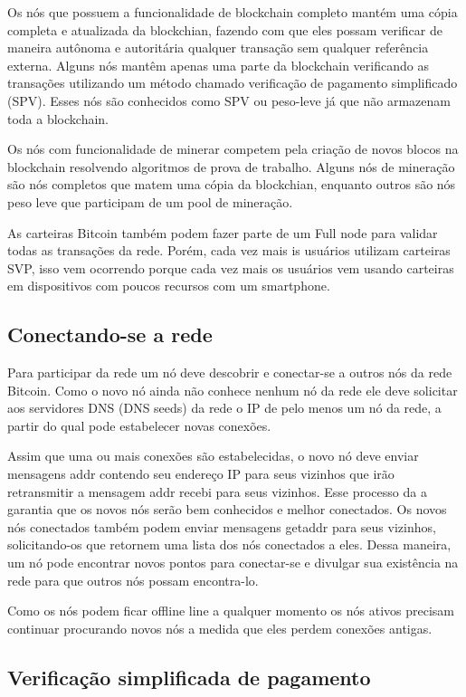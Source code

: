 \documentclass[conference,compsoc]{IEEEtran}
\begin{document}
Os nós que possuem a funcionalidade de blockchain completo mantém uma cópia completa e atualizada  da blockchian, fazendo com que eles possam verificar de maneira autônoma e autoritária qualquer transação sem qualquer referência externa. Alguns nós mantêm apenas uma parte da blockchain verificando as transações utilizando um método chamado verificação de pagamento simplificado (SPV). Esses nós são conhecidos como SPV ou peso-leve já que não armazenam toda a blockchain.

Os nós com funcionalidade de minerar competem pela criação de novos blocos na blockchain resolvendo algoritmos de prova de trabalho. Alguns nós de mineração são nós completos que matem uma cópia da blockchian, enquanto outros são nós peso leve que participam de um pool de mineração. 

As carteiras Bitcoin também podem fazer parte de um Full node para validar todas as transações da rede. Porém, cada vez mais is usuários utilizam carteiras SVP, isso vem ocorrendo porque cada vez mais os usuários vem usando carteiras em dispositivos com poucos recursos com um smartphone. 

\subsection*{Conectando-se a rede}

Para participar da rede um nó deve descobrir e conectar-se a outros nós da rede Bitcoin. Como o novo nó ainda não conhece nenhum nó da rede ele deve solicitar aos servidores DNS (DNS seeds) da rede o IP de pelo menos um nó da rede, a partir do qual pode estabelecer novas conexões.

Assim que uma ou mais conexões são estabelecidas, o novo nó deve enviar mensagens addr contendo seu endereço IP para seus vizinhos que irão retransmitir a mensagem addr recebi para seus vizinhos. Esse processo da a garantia que os novos nós serão bem conhecidos e melhor conectados. Os novos nós conectados também podem enviar mensagens getaddr para seus vizinhos, solicitando-os que retornem uma lista dos nós conectados a eles. Dessa maneira, um nó pode encontrar novos pontos para conectar-se e divulgar sua existência na rede para que outros nós possam encontra-lo.  

Como os nós podem ficar offline line a qualquer momento os nós ativos precisam continuar procurando novos nós a medida que eles perdem conexões antigas.

\subsection*{Verificação simplificada de pagamento}
\end{document}
